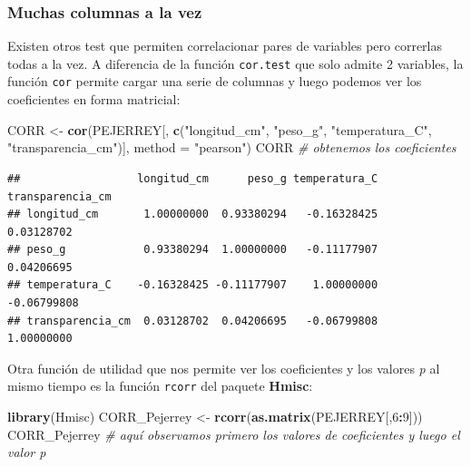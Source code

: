 \documentclass[
]{article}
\newenvironment{Shaded}{\begin{snugshade}}{\end{snugshade}}
\newcommand{\AttributeTok}[1]{\textcolor[rgb]{0.13,0.29,0.53}{#1}}
\newcommand{\CommentTok}[1]{\textcolor[rgb]{0.56,0.35,0.01}{\textit{#1}}}
\newcommand{\DecValTok}[1]{\textcolor[rgb]{0.00,0.00,0.81}{#1}}
\newcommand{\FunctionTok}[1]{\textcolor[rgb]{0.13,0.29,0.53}{\textbf{#1}}}
\newcommand{\NormalTok}[1]{#1}
\newcommand{\OtherTok}[1]{\textcolor[rgb]{0.56,0.35,0.01}{#1}}
\newcommand{\SpecialCharTok}[1]{\textcolor[rgb]{0.81,0.36,0.00}{\textbf{#1}}}
\newcommand{\StringTok}[1]{\textcolor[rgb]{0.31,0.60,0.02}{#1}}
\begin{document}
\subsubsection{Muchas columnas a la vez}\label{muchas-columnas-a-la-vez}

Existen otros test que permiten correlacionar pares de variables pero
correrlas todas a la vez. A diferencia de la función \texttt{cor.test}
que solo admite 2 variables, la función \texttt{cor} permite cargar una
serie de columnas y luego podemos ver los coeficientes en forma
matricial:

\begin{Shaded}
\begin{Highlighting}[]
\NormalTok{CORR }\OtherTok{\textless{}{-}} \FunctionTok{cor}\NormalTok{(PEJERREY[, }\FunctionTok{c}\NormalTok{(}\StringTok{"longitud\_cm"}\NormalTok{, }\StringTok{"peso\_g"}\NormalTok{, }\StringTok{"temperatura\_C"}\NormalTok{, }\StringTok{"transparencia\_cm"}\NormalTok{)],}
            \AttributeTok{method =} \StringTok{"pearson"}\NormalTok{)}
\NormalTok{CORR }\CommentTok{\# obtenemos los coeficientes}
\end{Highlighting}
\end{Shaded}

\begin{verbatim}
##                  longitud_cm      peso_g temperatura_C transparencia_cm
## longitud_cm       1.00000000  0.93380294   -0.16328425       0.03128702
## peso_g            0.93380294  1.00000000   -0.11177907       0.04206695
## temperatura_C    -0.16328425 -0.11177907    1.00000000      -0.06799808
## transparencia_cm  0.03128702  0.04206695   -0.06799808       1.00000000
\end{verbatim}

Otra función de utilidad que nos permite ver los coeficientes y los
valores \emph{p} al mismo tiempo es la función \texttt{rcorr} del
paquete \textbf{Hmisc}:

\begin{Shaded}
\begin{Highlighting}[]
\FunctionTok{library}\NormalTok{(Hmisc)}
\NormalTok{CORR\_Pejerrey }\OtherTok{\textless{}{-}} \FunctionTok{rcorr}\NormalTok{(}\FunctionTok{as.matrix}\NormalTok{(PEJERREY[,}\DecValTok{6}\SpecialCharTok{:}\DecValTok{9}\NormalTok{]))}
\NormalTok{CORR\_Pejerrey }\CommentTok{\# aquí observamos primero los valores de coeficientes y luego el valor p}
\end{Highlighting}
\end{Shaded}
\end{document}

